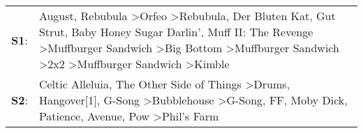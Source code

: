 \begin{supertabular}{p{0.03\textwidth}p{0.92\textwidth}}
 \textbf{S1}:  &  August\textsuperscript{}, \enspace Rebubula\textsuperscript{} \textgreater \enspace Orfeo\textsuperscript{} \textgreater \enspace Rebubula\textsuperscript{}, \enspace Der Bluten Kat\textsuperscript{}, \enspace Gut Strut\textsuperscript{}, \enspace Baby Honey Sugar Darlin'\textsuperscript{}, \enspace Muff II: The Revenge\textsuperscript{} \textgreater \enspace Muffburger Sandwich\textsuperscript{} \textgreater \enspace Big Bottom\textsuperscript{} \textgreater \enspace Muffburger Sandwich\textsuperscript{} \textgreater \enspace 2x2\textsuperscript{} \textgreater \enspace Muffburger Sandwich\textsuperscript{} \textgreater \enspace Kimble\textsuperscript{}  \enspace  \\
 \textbf{S2}:  &                                                                                                                                    Celtic Alleluia\textsuperscript{}, \enspace The Other Side of Things\textsuperscript{} \textgreater \enspace Drums\textsuperscript{}, \enspace Hangover[1]\textsuperscript{}, \enspace G-Song\textsuperscript{} \textgreater \enspace Bubblehouse\textsuperscript{} \textgreater \enspace G-Song\textsuperscript{}, \enspace FF\textsuperscript{}, \enspace Moby Dick\textsuperscript{}, \enspace Patience\textsuperscript{}, \enspace Avenue\textsuperscript{}, \enspace Pow\textsuperscript{} \textgreater \enspace Phil's Farm\textsuperscript{}  \enspace  \\
\end{supertabular}
